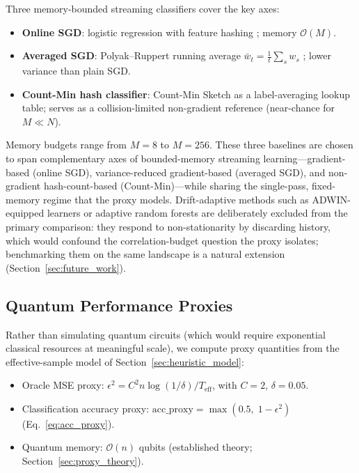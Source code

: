 \documentclass[sensors,article,submit,pdftex,moreauthors]{Definitions/mdpi}
\newcommand{\bigO}{\mathcal{O}}
\newcommand{\Teff}{T_{\mathrm{eff}}}
\providecommand{\DIFadd}[1]{{\protect\color{blue}#1}} %
\providecommand{\DIFaddbegin}{} %
\providecommand{\DIFaddend}{} %
\providecommand{\DIFdelbegin}{} %
\providecommand{\DIFdelend}{} %
\begin{document}
Three memory-bounded streaming classifiers cover the key axes:
\begin{itemize}
    \item \textbf{Online SGD}: logistic regression with feature hashing \citep{weinberger2009featurehashing, shalev2012online}; memory $\bigO(M)$.
    \item \textbf{Averaged SGD}: Polyak--Ruppert running average $\bar{w}_t = \frac{1}{t}\sum_s w_s$ \citep{polyak1992averaging}; lower variance than plain SGD.
    \item \textbf{Count-Min hash classifier}: Count-Min Sketch \citep{cormode2005improved} as a label-averaging lookup table; serves as a collision-limited non-gradient reference (near-chance for $M \ll N$).
\end{itemize}
Memory budgets range from $M = 8$ to $M = 256$. \DIFaddbegin \DIFadd{These three baselines are chosen to span complementary axes of bounded-memory streaming learning---gradient-based (online SGD), variance-reduced gradient-based (averaged SGD), and non-gradient hash-count-based (Count-Min)---while sharing the single-pass, fixed-memory regime that the proxy models. Drift-adaptive methods such as ADWIN-equipped learners or adaptive random forests }\citep{bifet2007adwin, gomes2017adaptiverf} \DIFadd{are deliberately excluded from the primary comparison: they respond to non-stationarity by discarding history, which would confound the correlation-budget question the proxy isolates; benchmarking them on the same landscape is a natural extension (Section~\ref{sec:future_work}).
}\DIFaddend 

\subsection{Quantum Performance Proxies}
\label{sec:quantum_proxies}

Rather than simulating quantum circuits (which would require exponential classical resources at meaningful scale), we compute proxy quantities from the effective-sample model of Section~\ref{sec:heuristic_model}:
\begin{itemize}
    \item Oracle MSE proxy: $\epsilon^2 = C^2 n \log(1/\delta) / \Teff$, with $C = 2$, $\delta = 0.05$.
    \item Classification accuracy proxy: $\mathrm{acc\_proxy} = \max(0.5,\; 1 - \epsilon^2)$ (Eq.~\ref{eq:acc_proxy}).
    \item Quantum memory: $\bigO(n)$ qubits \DIFdelbegin %
\DIFdelend \DIFaddbegin \DIFadd{(established theory; Section~\ref{sec:proxy_theory})}\DIFaddend .
\end{itemize}
\end{document}
